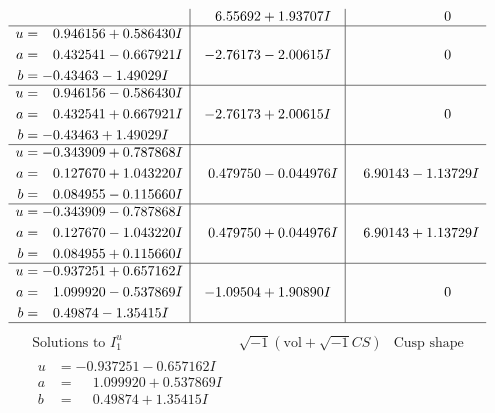 \documentclass[1p]{elsarticle_modified}
\theoremstyle{definition}
\newcommand{\I}{\sqrt{-1}}
\begin{document}
$$\begin{array}{c|c|c}
 & \phantom{-}6.55692 + 1.93707 I & \phantom{-0.000000 } 0 \\ \hline\begin{aligned}
u &= \phantom{-}0.946156 + 0.586430 I \\
a &= \phantom{-}0.432541 - 0.667921 I \\
b &= -0.43463 - 1.49029 I\end{aligned}
 & -2.76173 - 2.00615 I & \phantom{-0.000000 } 0 \\ \hline\begin{aligned}
u &= \phantom{-}0.946156 - 0.586430 I \\
a &= \phantom{-}0.432541 + 0.667921 I \\
b &= -0.43463 + 1.49029 I\end{aligned}
 & -2.76173 + 2.00615 I & \phantom{-0.000000 } 0 \\ \hline\begin{aligned}
u &= -0.343909 + 0.787868 I \\
a &= \phantom{-}0.127670 + 1.043220 I \\
b &= \phantom{-}0.084955 - 0.115660 I\end{aligned}
 & \phantom{-}0.479750 - 0.044976 I & \phantom{-}6.90143 - 1.13729 I \\ \hline\begin{aligned}
u &= -0.343909 - 0.787868 I \\
a &= \phantom{-}0.127670 - 1.043220 I \\
b &= \phantom{-}0.084955 + 0.115660 I\end{aligned}
 & \phantom{-}0.479750 + 0.044976 I & \phantom{-}6.90143 + 1.13729 I \\ \hline\begin{aligned}
u &= -0.937251 + 0.657162 I \\
a &= \phantom{-}1.099920 - 0.537869 I \\
b &= \phantom{-}0.49874 - 1.35415 I\end{aligned}
 & -1.09504 + 1.90890 I & \phantom{-0.000000 } 0\\
 \hline 
 \end{array}$$\newpage$$\begin{array}{c|c|c}  
\text{Solutions to }I^u_{1}& \I (\text{vol} + \sqrt{-1}CS) & \text{Cusp shape}\\
 \hline 
\begin{aligned}
u &= -0.937251 - 0.657162 I \\
a &= \phantom{-}1.099920 + 0.537869 I \\
b &= \phantom{-}0.49874 + 1.35415 I\end{aligned}

\end{array}$$
\end{document}

